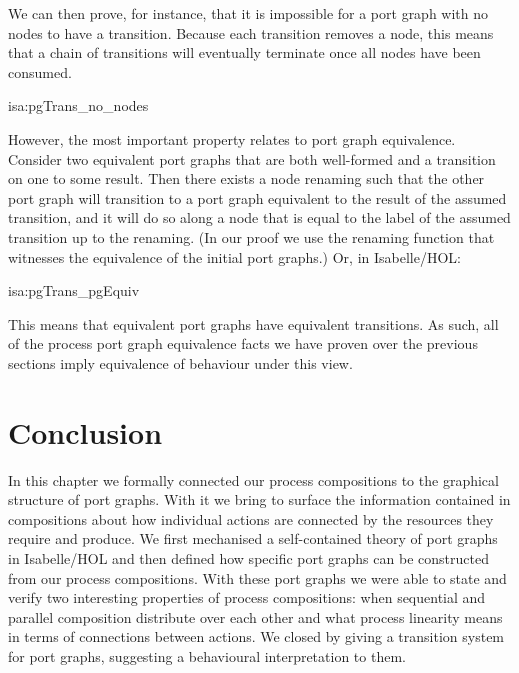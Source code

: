 \documentclass[class=smolathesis,crop=false]{standalone}
\begin{document}

We can then prove, for instance, that it is impossible for a port graph with no nodes to have a transition.
Because each transition removes a node, this means that a chain of transitions will eventually terminate once all nodes have been consumed.
\begin{isalemma}{isa:pgTrans_no_nodes}
  
\end{isalemma}

However, the most important property relates to port graph equivalence.
Consider two equivalent port graphs that are both well-formed and a transition on one to some result.
Then there exists a node renaming such that the other port graph will transition to a port graph equivalent to the result of the assumed transition, and it will do so along a node that is equal to the label of the assumed transition up to the renaming.
(In our proof we use the renaming function that witnesses the equivalence of the initial port graphs.)
Or, in Isabelle/HOL:
\begin{isalemma}{isa:pgTrans_pgEquiv}
  
\end{isalemma}

This means that equivalent port graphs have equivalent transitions.
As such, all of the process port graph equivalence facts we have proven over the previous sections imply equivalence of behaviour under this view.

\section{Conclusion}
\label{sec:port_graphs/conc}

In this chapter we formally connected our process compositions to the graphical structure of port graphs.
With it we bring to surface the information contained in compositions about how individual actions are connected by the resources they require and produce.
We first mechanised a self-contained theory of port graphs in Isabelle/HOL and then defined how specific port graphs can be constructed from our process compositions.
With these port graphs we were able to state and verify two interesting properties of process compositions: when sequential and parallel composition distribute over each other and what process linearity means in terms of connections between actions.
We closed by giving a transition system for port graphs, suggesting a behavioural interpretation to them.
\end{document}
